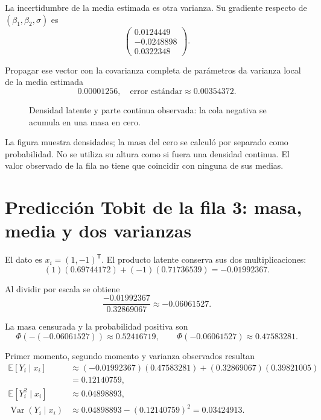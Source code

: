 \documentclass[11pt,a4paper]{article}
\newcommand{\E}{\mathbb E}
\newcommand{\T}{^{\mathsf T}}
\DeclareMathOperator{\Var}{Var}
\begin{document}
La incertidumbre de la media estimada
es otra varianza.
Su gradiente respecto de
\((\beta_1,\beta_2,\sigma)\) es
\[
\begin{pmatrix}0.0124449\\-0.0248898\\0.0322348\end{pmatrix}.
\]

Propagar ese vector con la
covarianza completa de parámetros
da varianza local de la
media estimada
\[
0.00001256,\quad\text{error estándar}\approx0.00354372.
\]

\begin{figure}[H]\centering
{}
\caption{Densidad latente y parte continua observada: la cola negativa se acumula en una masa en cero.}
\end{figure}

La figura muestra densidades;
la masa del cero se calculó
por separado como probabilidad.
No se utiliza su altura
como si fuera una densidad continua.
El valor observado de la fila
no tiene que coincidir
con ninguna de sus medias.

\clearpage
\section{Predicción Tobit de la fila 3: masa, media y dos varianzas}\label{unidad115}
El dato es \(x_i=(1,-1)\T\).
El producto latente conserva
sus dos multiplicaciones:
\[
(1)(0.69744172)+(-1)(0.71736539)=-0.01992367.
\]

Al dividir por escala se obtiene
\[
\frac{-0.01992367}{0.32869067}\approx-0.06061527.
\]

La masa censurada y la
probabilidad positiva son
\[
\Phi(-(-0.06061527))\approx0.52416719,\qquad\Phi(-0.06061527)\approx0.47583281.
\]

Primer momento, segundo momento
y varianza observados resultan
\[
\begin{aligned}
\E[Y_i\mid x_i]&\approx(-0.01992367)(0.47583281)+(0.32869067)(0.39821005)\\
&=0.12140759,\\
\E[Y_i^2\mid x_i]&\approx0.04898893,\\
\Var(Y_i\mid x_i)&\approx0.04898893-(0.12140759)^2=0.03424913.\end{aligned}
\]
\end{document}
